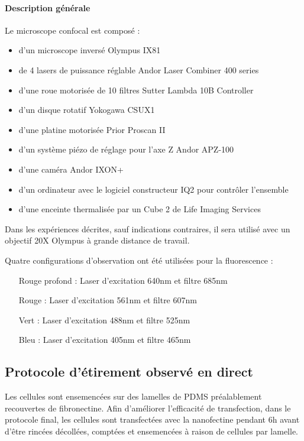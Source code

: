 \documentclass{report}
\begin{document}
	\paragraph{Description générale}
	
	Le microscope confocal est composé : 
	\begin{itemize}
	\item d'un microscope inversé Olympus IX81
	\item de 4 lasers de puissance réglable Andor Laser Combiner 400 series
	\item d'une roue motorisée de 10 filtres Sutter Lambda 10B Controller
	\item d'un disque rotatif Yokogawa CSUX1
	\item d'une platine motorisée Prior Proscan II
	\item d'un système piézo de réglage pour l'axe Z Andor APZ-100
	\item d'une caméra Andor IXON+
	\item d'un ordinateur avec le logiciel constructeur IQ2 pour contrôler l'ensemble
	\item d'une enceinte thermalisée par un Cube 2 de Life Imaging Services
\end{itemize}	 

Dans les expériences décrites, sauf indications contraires, il sera utilisé avec un objectif 20X Olympus à grande distance de travail. 

Quatre configurations d'observation ont été utilisées pour la fluorescence : 
\begin{itemize}
\item[Rouge profond] : Laser d'excitation 640nm et filtre 685nm
\item[Rouge] : Laser d'excitation 561nm et filtre 607nm
\item[Vert] : Laser d'excitation 488nm et filtre 525nm
\item[Bleu] : Laser d'excitation 405nm et filtre 465nm
\end{itemize}
	
	\subsection{Protocole d'étirement observé en direct}
	Les cellules sont ensemencées sur des lamelles de PDMS préalablement recouvertes de fibronectine. Afin d'améliorer l'efficacité de transfection, dans le protocole final, les cellules sont transfectées avec la nanofectine pendant 6h avant d'être rincées décollées, comptées et ensemencées à raison de  cellules par lamelle. 
	
\end{document}
